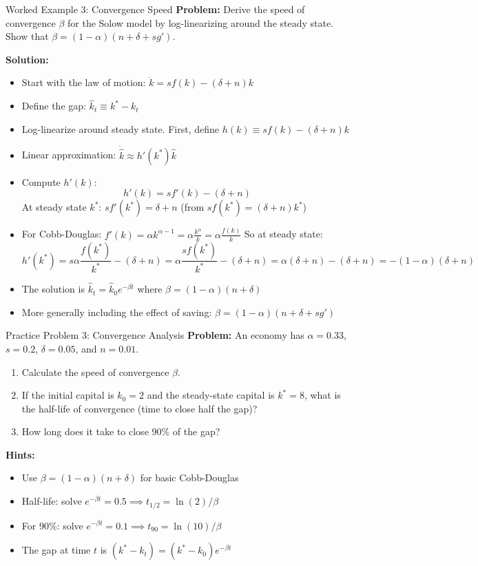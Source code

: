 \begin{frame}{Worked Example 3: Convergence Speed}
\textbf{Problem:} Derive the speed of convergence $\beta$ for the Solow model by log-linearizing around the steady state. Show that $\beta = (1-\alpha)(n + \delta + sg')$.

\bigskip
\textbf{Solution:}

\begin{itemize}
\item Start with the law of motion: $\dot{k} = sf(k) - (\delta + n)k$
\item Define the gap: $\hat{k}_t \equiv k^* - k_t$
\item Log-linearize around steady state. First, define $h(k) \equiv sf(k) - (\delta + n)k$
\item Linear approximation: $\dot{\hat{k}} \approx h'(k^*) \hat{k}$
\item Compute $h'(k)$:
\[
h'(k) = sf'(k) - (\delta + n)
\]
At steady state $k^*$: $sf'(k^*) = \delta + n$ (from $sf(k^*) = (\delta + n)k^*$)
\item For Cobb-Douglas: $f'(k) = \alpha k^{\alpha-1} = \alpha \frac{k^\alpha}{k} = \alpha \frac{f(k)}{k}$
So at steady state:
\[
h'(k^*) = s\alpha \frac{f(k^*)}{k^*} - (\delta + n) = \alpha \frac{sf(k^*)}{k^*} - (\delta + n) = \alpha(\delta + n) - (\delta + n) = -(1-\alpha)(\delta + n)
\]
\item The solution is $\hat{k}_t = \hat{k}_0 e^{-\beta t}$ where $\beta = (1-\alpha)(n + \delta)$
\item More generally including the effect of saving: $\boxed{\beta = (1-\alpha)(n + \delta + sg')}$
\end{itemize}

\end{frame}

\begin{frame}{Practice Problem 3: Convergence Analysis}
\textbf{Problem:} An economy has $\alpha = 0.33$, $s = 0.2$, $\delta = 0.05$, and $n = 0.01$.
\begin{enumerate}
\item Calculate the speed of convergence $\beta$.
\item If the initial capital is $k_0 = 2$ and the steady-state capital is $k^* = 8$, what is the half-life of convergence (time to close half the gap)?
\item How long does it take to close 90\% of the gap?
\end{enumerate}

\bigskip
\textbf{Hints:}
\begin{itemize}
\item Use $\beta = (1-\alpha)(n + \delta)$ for basic Cobb-Douglas
\item Half-life: solve $e^{-\beta t} = 0.5 \implies t_{1/2} = \ln(2)/\beta$
\item For 90\%: solve $e^{-\beta t} = 0.1 \implies t_{90} = \ln(10)/\beta$
\item The gap at time $t$ is $(k^* - k_t) = (k^* - k_0)e^{-\beta t}$
\end{itemize}

\end{frame}

